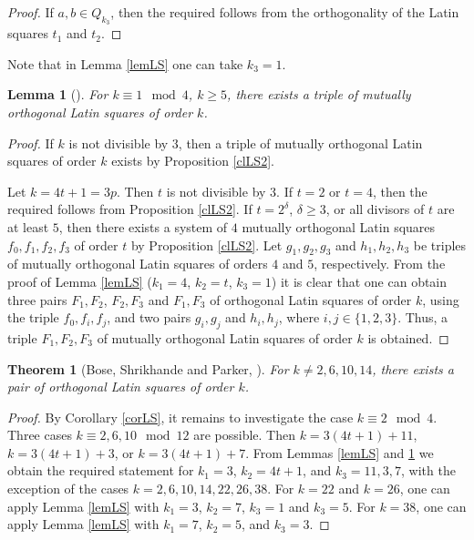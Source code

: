 \documentclass[11pt]{article}
\newtheorem{theorem}{Theorem}[section]
\newtheorem{lemma}{Lemma}[section]
\theoremstyle{definition}
\begin{document}
{{{\begin{proof}
If $a,b\in Q_{k_3}$, then the required follows from the orthogonality of the
Latin squares $t_1$ and $t_2$.
\end{proof}

Note that in Lemma \ref{lemLS} one can take $k_3=1$.

\begin{lemma}[\cite{DenesK}]\label{lemLS1}
For $k\equiv 1\mod 4$, $k\geq 5$, there exists a triple of mutually
orthogonal Latin squares of order $k$.
\end{lemma}
\begin{proof}
If $k$ is not divisible by $3$, then a triple of mutually orthogonal
Latin squares of order $k$ exists by Proposition \ref{clLS2}.

Let $k=4t+1=3p$. Then $t$ is not divisible by $3$. If $t=2$ or
$t=4$, then the required follows from Proposition  \ref{clLS2}. If
$t=2^\delta$, $\delta\geq 3$, or all divisors of $t$ are at least $5$, then
there exists a system of $4$ mutually orthogonal Latin squares
$f_0,f_1,f_2,f_3$ of order $t$ by Proposition \ref{clLS2}. Let
$g_1,g_2,g_3$ and $h_1,h_2,h_3$ be triples of mutually orthogonal Latin
squares of orders $4$ and $5$, respectively. From the proof of Lemma
\ref{lemLS} ($k_1=4$, $k_2=t$, $k_3=1$) it is clear that one can obtain three
pairs $F_1, F_2$, $F_2, F_3$ and $F_1, F_3$ of orthogonal Latin squares of order $k$, using the triple
$f_0,f_i,f_j$, and two pairs $g_i,g_j$ and $h_i,h_j$, where
$i,j\in\{1,2,3\}$.
  Thus, a triple $F_1, F_2, F_3$ of mutually
orthogonal Latin squares of order $k$ is obtained.
\end{proof}

\begin{theorem}[Bose, Shrikhande and Parker, \cite{BShP}]\label{thLS1}
For $k\neq 2,6,10,14$, there exists a pair of orthogonal Latin
squares of order $k$.
\end{theorem}
\begin{proof}
By Corollary \ref{corLS}, it remains to investigate the case $k\equiv 2\mod
4$. Three cases $k\equiv 2,6,10\mod 12$  are possible. Then 
$k=3(4t+1)+11$, $k=3(4t+1)+3$, or $k=3(4t+1)+7$. From Lemmas
\ref{lemLS} and \ref{lemLS1} we obtain the required statement for $k_1=3$,
$k_2=4t+1$, and $k_3=11,3,7$, with the exception of the cases
$k=2,6,10,14,22,26,38$. For $k=22$ and $k=26$, one can apply Lemma
\ref{lemLS} with $k_1=3$, $k_2=7$, $k_3=1$ and $k_3=5$. For $k=38$,
one can apply Lemma \ref{lemLS} with $k_1=7$, $k_2=5$, and $k_3=3$.
\end{proof}

}}}
\end{document}

